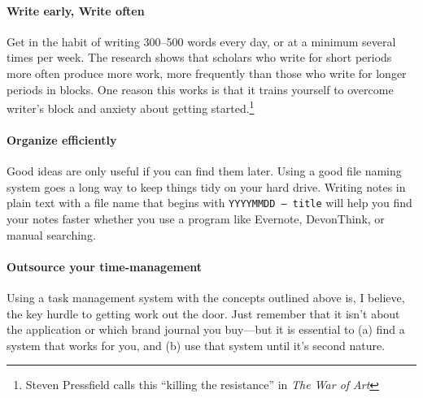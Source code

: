\documentclass{tufte-handout}
\begin{document}
\paragraph{Write early, Write often} Get in the habit of writing 300--500 words every day, or at a minimum several times per week. The research
shows that scholars who write for short periods more often produce
more work, more frequently than those who write for longer periods in
blocks. One reason this works is that it trains yourself to overcome writer's
  block and anxiety about getting started.\footnote{Steven
    Pressfield calls this ``killing the resistance'' in \textit{The War of Art}}

\paragraph{Organize efficiently}

Good ideas are only useful if you can find them later. Using a good file naming system goes a long way to keep things tidy on your hard drive. Writing
notes in plain text with a file name that begins with \texttt{YYYYMMDD
  -- title} will help you find your notes faster whether you use a
program like Evernote, DevonThink, or manual
searching.


\paragraph{Outsource your time-management}

Using a task management system with the concepts outlined above is, I
believe, the key hurdle to getting work out the door. Just remember that it isn't about the application or which brand journal you buy---but it is essential to (a) find a system that works for you, and (b) use that system until it's second nature.

\end{document}
